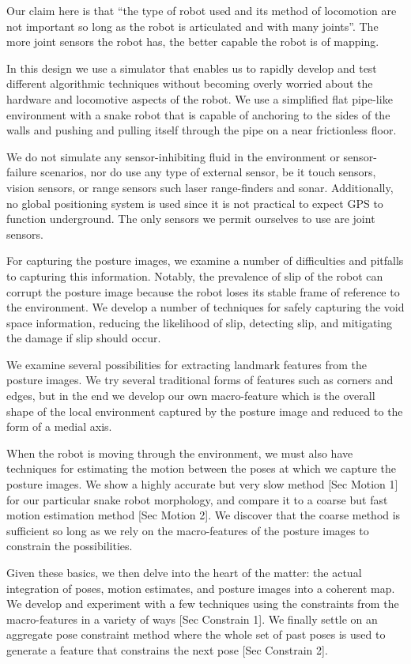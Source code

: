 Our claim here is that “the type of robot used and its method of locomotion are not important so long as the robot is articulated and with many joints”. The more joint sensors the robot has, the better capable the robot is of mapping.

In this design we use a simulator that enables us to rapidly develop and test different algorithmic techniques without becoming overly worried about the hardware and locomotive aspects of the robot. We use a simplified flat pipe-like environment with a snake robot that is capable of anchoring to the sides of the walls and pushing and pulling itself through the pipe on a near frictionless floor. 

We do not simulate any sensor-inhibiting fluid in the environment or sensor-failure scenarios, nor do use any type of external sensor, be it touch sensors, vision sensors, or range sensors such laser range-finders and sonar. Additionally, no global positioning system is used since it is not practical to expect GPS to function underground. The only sensors we permit ourselves to use are joint sensors.

For capturing the posture images, we examine a number of difficulties and pitfalls to capturing this information. Notably, the prevalence of slip of the robot can corrupt the posture image because the robot loses its stable frame of reference to the environment. We develop a number of techniques for safely capturing the void space information, reducing the likelihood of slip, detecting slip, and mitigating the damage if slip should occur.

We examine several possibilities for extracting landmark features from the posture images. We try several traditional forms of features such as corners and edges, but in the end we develop our own macro-feature which is the overall shape of the local environment captured by the posture image and reduced to the form of a medial axis.

When the robot is moving through the environment, we must also have techniques for estimating the motion between the poses at which we capture the posture images. We show a highly accurate but very slow method [Sec Motion 1] for our particular snake robot morphology, and compare it to a coarse but fast motion estimation method [Sec Motion 2]. We discover that the coarse method is sufficient so long as we rely on the macro-features of the posture images to constrain the possibilities.

Given these basics, we then delve into the heart of the matter: the actual integration of poses, motion estimates, and posture images into a coherent map. We develop and experiment with a few techniques using the constraints from the macro-features in a variety of ways [Sec Constrain 1]. We finally settle on an aggregate pose constraint method where the whole set of past poses is used to generate a feature that constrains the next pose [Sec Constrain 2].

